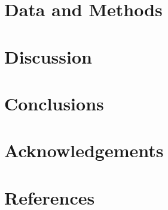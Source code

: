 \documentclass[aas_macros,preprint]{aastex}%
\begin{document}
\section{Data and Methods}

\section{}

\section{Discussion}

\section{Conclusions}

\section*{Acknowledgements}

\section*{References}
\end{document}

